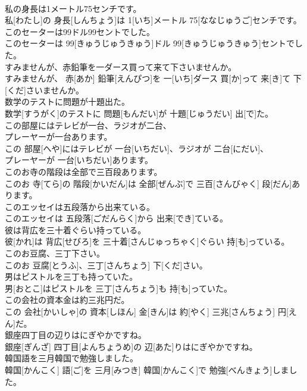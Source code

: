 \documentclass[8pt]{extreport}
\begin{document}
\begin{CJK}{UTF8}{min}
\\	私の身長は1メートル75センチです。	
\\	私[わたし]の 身長[しんちょう]は 1[いち]メートル 75[ななじゅうご]センチです。
\\	このセーターは99ドル99セントでした。	
\\	このセーターは 99[きゅうじゅうきゅう]ドル 99[きゅうじゅうきゅう]セントでした。
\\	すみませんが、赤鉛筆を一ダース買って来て下さいませんか。	
\\	すみませんが、 赤[あか] 鉛筆[えんぴつ]を 一[いち]ダース 買[か]って 来[き]て 下[くだ]さいませんか。
\\	数学のテストに問題が十題出た。	
\\	数学[すうがく]のテストに 問題[もんだい]が 十題[じゅうだい] 出[で]た。
\\	この部屋にはテレビが一台、ラジオが二台、
\\	プレーヤーが一台あります。	
\\	この 部屋[へや]にはテレビが 一台[いちだい]、ラジオが 二台[にだい]、 
\\	プレーヤーが 一台[いちだい]あります。
\\	このお寺の階段は全部で三百段あります。	
\\	このお 寺[てら]の 階段[かいだん]は 全部[ぜんぶ]で 三百[さんびゃく] 段[だん]あります。
\\	このエッセイは五段落から出来ている。	
\\	このエッセイは 五段落[ごだんらく]から 出来[でき]ている。
\\	彼は背広を三十着ぐらい持っている。	
\\	彼[かれ]は 背広[せびろ]を 三十着[さんじゅっちゃく]ぐらい 持[も]っている。
\\	このお豆腐、三丁下さい。	
\\	このお 豆腐[とうふ]、三丁[さんちょう] 下[くだ]さい。
\\	男はピストルを三丁も持っていた。	
\\	男[おとこ]はピストルを 三丁[さんちょう]も 持[も]っていた。
\\	この会社の資本金は約三兆円だ。	
\\	この 会社[かいしゃ]の 資本[しほん] 金[きん]は 約[やく] 三兆[さんちょう] 円[えん]だ。
\\	銀座四丁目の辺りはにぎやかですね。	
\\	銀座[ぎんざ] 四丁目[よんちょうめ]の 辺[あた]りはにぎやかですね。
\\	韓国語を三月韓国で勉強しました。	
\\	韓国[かんこく] 語[ご]を 三月[みつき] 韓国[かんこく]で 勉強[べんきょう]しました。

\end{CJK}
\end{document}
